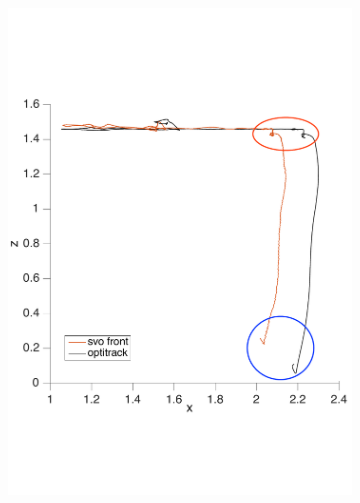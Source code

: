 \begin{figure}[!htbp]
\begin{subfigure}[b]{0.4\textwidth}
        \includegraphics[width=\textwidth]{img/fly_with_landing_trajectory_x.pdf}
        \label{fig:comparision_svo_position_drifting_x}
   \end{subfigure}\hfill
   \begin{subfigure}[b]{0.4\textwidth}

\end{subfigure}
\end{figure}
